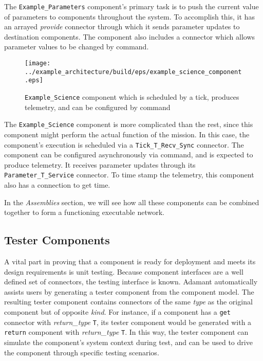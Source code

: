 The \texttt{Example\_Parameters} component's primary task is to push the current value of parameters to components throughout the system. To accomplish this, it has an arrayed \textit{provide} connector through which it sends parameter updates to destination components. The component also includes a connector which allows parameter values to be changed by command. 

\begin{figure}[H]
  \texttt{[image: ../example\_architecture/build/eps/example\_science\_component.eps]}
  \caption{\texttt{Example\_Science} component which is scheduled by a tick, produces telemetry, and can be configured by command}
\end{figure}

The \texttt{Example\_Science} component is more complicated than the rest, since this component might perform the actual function of the mission. In this case, the component's execution is scheduled via a \texttt{Tick\_T\_Recv\_Sync} connector. The component can be configured asynchronously via command, and is expected to produce telemetry. It receives parameter updates through its \texttt{Parameter\_T\_Service} connector. To time stamp the telemetry, this component also has a connection to get time.

In the \textit{Assemblies} section, we will see how all these components can be combined together to form a functioning executable network.

\subsection{Tester Components}

A vital part in proving that a component is ready for deployment and meets its design requirements is unit testing. Because component interfaces are a well defined set of connectors, the testing interface is known. Adamant automatically assists users by generating a tester component from the component model. The resulting tester component contains connectors of the same \textit{type} as the original component but of opposite \textit{kind}. For instance, if a component has a \texttt{get} connector with \textit{return\_type} \texttt{T}, its tester component would be generated with a \texttt{return} component with \textit{return\_type} \texttt{T}. In this way, the tester component can simulate the component's system context during test, and can be used to drive the component through specific testing scenarios. 

